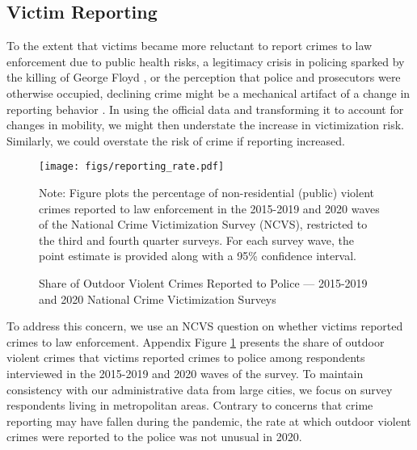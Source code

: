 \subsection{Victim Reporting} \label{sec:reporting}
To the extent that victims became more reluctant to report crimes to law enforcement due to public health risks, a legitimacy crisis in policing \citep{tyler2004enhancing, tankebe2014police, wolfe2016effect} sparked by the killing of George Floyd \citep{nix2021more}, or the perception that police and prosecutors were otherwise occupied, declining crime might be a mechanical artifact of a change in reporting behavior \citep{van1979victim, levitt1998relationship, davis2003willingness}. In using the official data and transforming it to account for changes in mobility, we might then understate the increase in victimization risk. Similarly, we could overstate the risk of crime if reporting increased.
\begin{figure}[h!]
     \begin{center}
    \caption{Share of Outdoor Violent Crimes Reported to Police --- 2015-2019 and 2020 National Crime Victimization Surveys}
    \texttt{[image: figs/reporting\_rate.pdf]}
    \label{fig:reporting_rate}
     \end{center}
        \vspace*{-8mm}  
        \newline 
Note: Figure plots the percentage of non-residential (public) violent crimes reported to law enforcement in the 2015-2019 and 2020 waves of the National Crime Victimization Survey (NCVS), restricted to the third and fourth quarter surveys. For each survey wave, the point estimate is provided along with a 95\% confidence interval.
\end{figure}
To address this concern, we use an NCVS question on whether victims reported crimes to law enforcement. Appendix Figure \ref{fig:reporting_rate} presents the share of outdoor violent crimes that victims reported crimes to police among respondents interviewed in the 2015-2019 and 2020 waves of the survey. To maintain consistency with our administrative data from large cities, we focus on survey respondents living in metropolitan areas. Contrary to concerns that crime reporting may have fallen during the pandemic, the rate at which outdoor violent crimes were reported to the police was not unusual in 2020.


